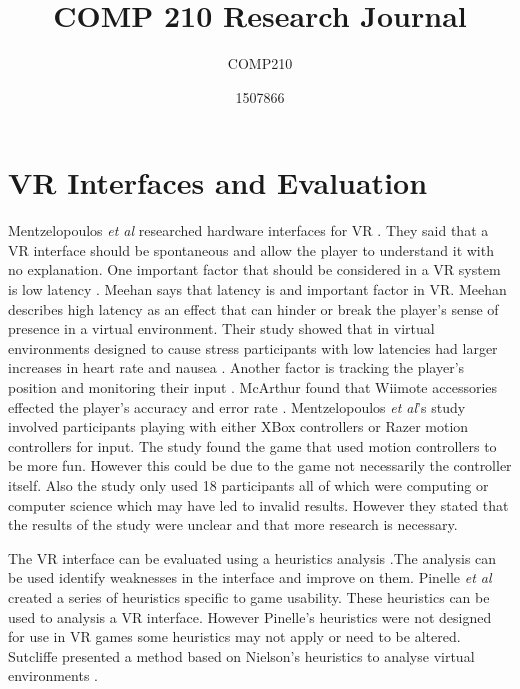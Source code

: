 \documentclass{scrartcl}
\title{COMP 210 Research Journal}
\subtitle{COMP210}
\author{1507866}
\begin{document}
	
\maketitle
	
\abstract{}
	
\section{VR Interfaces and Evaluation}
Mentzelopoulos \textit{et al} researched hardware interfaces for VR \cite{Mentzelopoulos}. They said that a VR interface should be spontaneous and allow the player to understand it with no explanation.
One important factor that should be considered in a VR system is low latency \cite{Mentzelopoulos, Meehan}. 
 Meehan says that latency is and important factor in VR. Meehan describes high latency as an effect that can hinder or break the player's sense of presence in a virtual environment. Their study showed that in virtual environments designed to cause stress participants with low latencies had larger increases in heart rate and nausea \cite{Meehan}.
Another factor is tracking the player's position and monitoring their input \cite{Mentzelopoulos}. McArthur found that Wiimote accessories effected the player's accuracy and error rate \cite{McArthur}.
Mentzelopoulos \textit{et al}'s study involved participants playing with either XBox controllers or Razer motion controllers for input. The study found the game that used motion controllers to be more fun. However this could be due to the game not necessarily the controller itself. Also the study only used 18 participants all of which were computing or computer science which may have led to invalid results. However they stated that the results of the study were unclear and that more research is necessary. 


The VR interface can be evaluated using a heuristics analysis \cite{Nielsen, Pinelle}.The analysis can be used identify weaknesses in the interface and improve on them. Pinelle \textit{et al} created a series of heuristics specific to game usability. These heuristics can be used to analysis a VR interface. However Pinelle's heuristics were not designed for use in VR games some heuristics may not apply or need to be altered.  Sutcliffe presented a method based on Nielson's heuristics to analyse virtual environments \cite{sutcliffe2004heuristic}.
\end{document}
